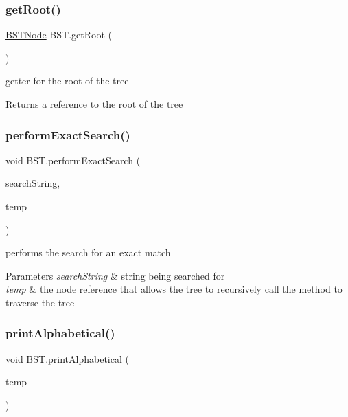 \subsubsection{\texorpdfstring{get\+Root()}{getRoot()}}
{\footnotesize\ttfamily \hyperlink{class_b_s_t_node}{B\+S\+T\+Node} B\+S\+T.\+get\+Root (\begin{DoxyParamCaption}{ }\end{DoxyParamCaption})}



getter for the root of the tree 

\begin{DoxyReturn}{Returns}
a reference to the root of the tree 
\end{DoxyReturn}
\mbox{\label{class_b_s_t_a2241cab2084ec74baea6feef5cf2df34}} 
\subsubsection{\texorpdfstring{perform\+Exact\+Search()}{performExactSearch()}}
{\footnotesize\ttfamily void B\+S\+T.\+perform\+Exact\+Search (\begin{DoxyParamCaption}\item[{String}]{search\+String,  }\item[{\hyperlink{class_b_s_t_node}{B\+S\+T\+Node}}]{temp }\end{DoxyParamCaption})}



performs the search for an exact match 


\begin{DoxyParams}{Parameters}
{\em search\+String} & string being searched for \\
\hline
{\em temp} & the node reference that allows the tree to recursively call the method to traverse the tree \\
\hline
\end{DoxyParams}
\mbox{\label{class_b_s_t_a25a44d8679e06abada215f152dab7546}} 
\subsubsection{\texorpdfstring{print\+Alphabetical()}{printAlphabetical()}}
{\footnotesize\ttfamily void B\+S\+T.\+print\+Alphabetical (\begin{DoxyParamCaption}\item[{\hyperlink{class_b_s_t_node}{B\+S\+T\+Node}}]{temp }\end{DoxyParamCaption})}



